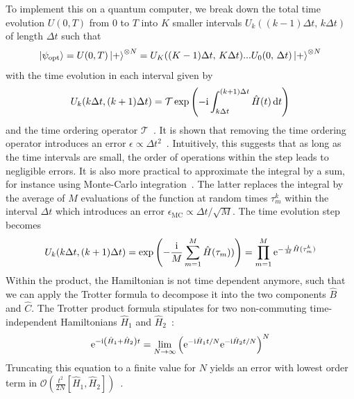 To implement this on a quantum computer, we break down the total time evolution $U(0, T)$ from 0 to $T$ into $K$ smaller intervals $U_k((k-1)\Delta t,\, k\Delta t)$ of length $\Delta t$ such that
\begin{equation} \label{eq:qaoa_discretized_adiabatic_evolution}
    \ket{\psi_{\textrm{opt}}} = U(0, T)\ket{+}^{\otimes N} = U_K((K-1)\Delta t, \,K\Delta t) ... U_0(0,\, \Delta t) \ket{+}^{\otimes N}
\end{equation}
with the time evolution in each interval given by 
\begin{equation}
    U_k(k\Delta t, (k+1)\Delta t) = \mathcal{T}\exp{\left(-\mathrm i\int_{k\Delta t}^{(k+1)\Delta t} \hat H(t)\ensuremath{\,\mathrm d}t\right)}
\end{equation}
 and the time ordering operator $\mathcal{T}$~\cite[p. 143]{Weinberg1995TheFields}. It is shown that removing the time ordering operator introduces an error $\epsilon \propto \Delta t^2$~\cite{Poulin2011QuantumSpace}. Intuitively, this suggests that as long as the time intervals are small, the order of operations within the step leads to negligible errors. It is also more practical to approximate the integral by a sum, for instance using Monte-Carlo integration~\cite{Poulin2011QuantumSpace}. The latter replaces the integral by the average of $M$ evaluations of the function at random times $\tau_m^k$ within the interval $\Delta t$ which introduces an error $\epsilon_{\textrm{MC}} \propto \Delta t/\sqrt{M}$. The time evolution step becomes
 \begin{equation}
     U_k(k\Delta t, (k+1)\Delta t) = \exp{\left(-\frac{\mathrm i}{M}\sum_{m=1 }^{M} \hat H(\tau_m))\right)} =  \prod_{m=1}^M \mathrm e^{-\frac{\mathrm i}{M}\hat H(\tau_m^k)}
 \end{equation}
 Within the product, the Hamiltonian is not time dependent anymore, such that we can apply the Trotter formula to decompose it into the two components $\hat B$ and $\hat C$. 
 The Trotter product formula stipulates for two non-commuting time-independent Hamiltonians $\hat H_1$ and $\hat H_2$~\cite{TrotterMathematics}:
\begin{equation} \label{eq:qaoa_product_formula}
    \mathrm e^{-\mathrm i\left(\hat H_{1} + \hat H_{2}\right) t}=\lim _{N \rightarrow \infty}\left(\mathrm e^{-\mathrm i \hat H_{1} t / N} \mathrm e^{-\mathrm i \hat H_{2} t / N}\right)^{N}
\end{equation}
Truncating this equation to a finite value for $N$ yields an error with lowest order term in $\mathcal{O}\left(\frac{t^2}{2N} [\hat H_1, \hat H_2]\right)$~\cite{Heyl2018QuantumSimulation, Lloyd1996UniversalSimulators}. 

